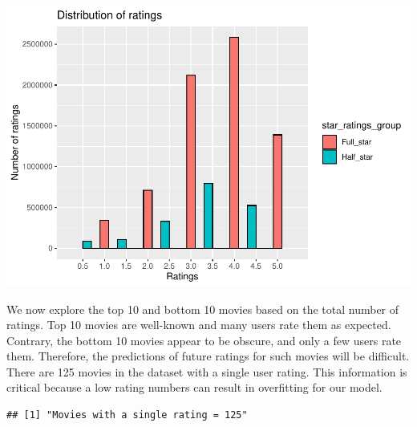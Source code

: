 \documentclass[]{article}
\newenvironment{Shaded}{\begin{snugshade}}{\end{snugshade}}
\newcommand{\DataTypeTok}[1]{\textcolor[rgb]{0.13,0.29,0.53}{#1}}
\newcommand{\DecValTok}[1]{\textcolor[rgb]{0.00,0.00,0.81}{#1}}
\newcommand{\KeywordTok}[1]{\textcolor[rgb]{0.13,0.29,0.53}{\textbf{#1}}}
\newcommand{\NormalTok}[1]{#1}
\newcommand{\OperatorTok}[1]{\textcolor[rgb]{0.81,0.36,0.00}{\textbf{#1}}}
\newcommand{\StringTok}[1]{\textcolor[rgb]{0.31,0.60,0.02}{#1}}
\begin{document}
\includegraphics{Project_MovieLens_files/figure-latex/unnamed-chunk-14-1.pdf}

We now explore the top 10 and bottom 10 movies based on the total number
of ratings. Top 10 movies are well-known and many users rate them as
expected. Contrary, the bottom 10 movies appear to be obscure, and only
a few users rate them. Therefore, the predictions of future ratings for
such movies will be difficult. There are 125 movies in the dataset with
a single user rating. This information is critical because a low rating
numbers can result in overfitting for our model.

\begin{Shaded}
\end{Shaded}

\begin{verbatim}
## [1] "Movies with a single rating = 125"
\end{verbatim}

\begin{Shaded}
\end{Shaded}
\end{document}
